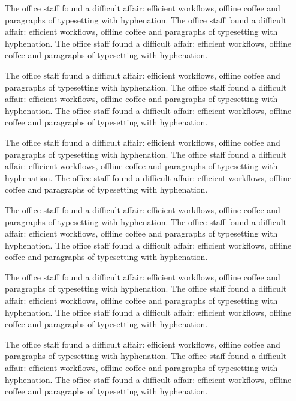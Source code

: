 \documentclass{book}
\begin{document}
The office staff found a difficult affair: efficient workflows, offline coffee and paragraphs of typesetting with hyphenation. The office staff found a difficult affair: efficient workflows, offline coffee and paragraphs of typesetting with hyphenation. The office staff found a difficult affair: efficient workflows, offline coffee and paragraphs of typesetting with hyphenation. 

The office staff found a difficult affair: efficient workflows, offline coffee and paragraphs of typesetting with hyphenation. The office staff found a difficult affair: efficient workflows, offline coffee and paragraphs of typesetting with hyphenation. The office staff found a difficult affair: efficient workflows, offline coffee and paragraphs of typesetting with hyphenation. 

The office staff found a difficult affair: efficient workflows, offline coffee and paragraphs of typesetting with hyphenation. The office staff found a difficult affair: efficient workflows, offline coffee and paragraphs of typesetting with hyphenation. The office staff found a difficult affair: efficient workflows, offline coffee and paragraphs of typesetting with hyphenation. 

The office staff found a difficult affair: efficient workflows, offline coffee and paragraphs of typesetting with hyphenation. The office staff found a difficult affair: efficient workflows, offline coffee and paragraphs of typesetting with hyphenation. The office staff found a difficult affair: efficient workflows, offline coffee and paragraphs of typesetting with hyphenation. 

The office staff found a difficult affair: efficient workflows, offline coffee and paragraphs of typesetting with hyphenation. The office staff found a difficult affair: efficient workflows, offline coffee and paragraphs of typesetting with hyphenation. The office staff found a difficult affair: efficient workflows, offline coffee and paragraphs of typesetting with hyphenation. 

The office staff found a difficult affair: efficient workflows, offline coffee and paragraphs of typesetting with hyphenation. The office staff found a difficult affair: efficient workflows, offline coffee and paragraphs of typesetting with hyphenation. The office staff found a difficult affair: efficient workflows, offline coffee and paragraphs of typesetting with hyphenation. 
\end{document}
